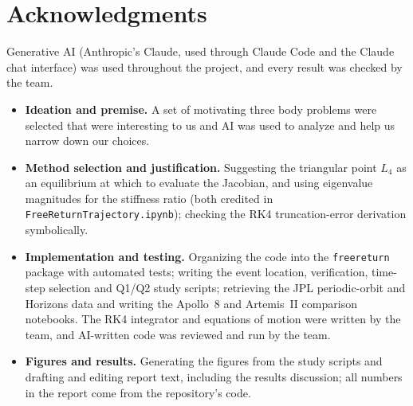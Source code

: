 \documentclass[11pt]{article}
\begin{document}
\section*{Acknowledgments}

Generative AI (Anthropic's Claude, used through Claude Code and the Claude chat interface) was used throughout the project, and every result was checked by the team.
\begin{itemize}[leftmargin=2em]
  \item \textbf{Ideation and premise.} A set of motivating three body problems were selected that were interesting to us and AI was used to analyze and help us narrow down our choices. 
  \item \textbf{Method selection and justification.} Suggesting the triangular point $L_4$ as an equilibrium at which to evaluate the Jacobian, and using eigenvalue magnitudes for the stiffness ratio (both credited in \texttt{FreeReturnTrajectory.ipynb}); checking the RK4 truncation-error derivation symbolically.
  \item \textbf{Implementation and testing.} Organizing the code into the \texttt{freereturn} package with automated tests; writing the event location, verification, time-step selection and Q1/Q2 study scripts; retrieving the JPL periodic-orbit and Horizons data and writing the Apollo~8 and Artemis~II comparison notebooks. The RK4 integrator and equations of motion were written by the team, and AI-written code was reviewed and run by the team.
  \item \textbf{Figures and results.} Generating the figures from the study scripts and drafting and editing report text, including the results discussion; all numbers in the report come from the repository's code.
\end{itemize}
\end{document}
